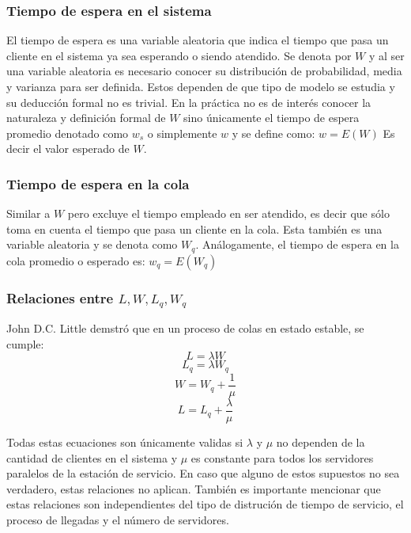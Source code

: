 \documentclass{article}
\begin{document}
\subsubsection{Tiempo de espera en el sistema}
El tiempo de espera es una variable aleatoria que indica el tiempo que pasa
un cliente en el sistema ya sea esperando o siendo atendido. 
Se denota por $W$ y al ser una variable aleatoria
es necesario conocer su distribución de probabilidad, media y varianza para ser
definida. Estos dependen de que tipo de modelo se estudia y su deducción formal
no es trivial. En la práctica no es de interés conocer la naturaleza y definición
formal de $W$ sino únicamente el tiempo de espera promedio 
denotado como $w_{s}$ o simplemente $w$ y se define como: $w = E\left(W\right) $
Es decir el valor esperado de $W$.
\subsubsection{Tiempo de espera en la cola}
Similar a $W$ pero excluye el tiempo empleado en ser atendido, es decir
que sólo toma en cuenta el tiempo que pasa un cliente en la cola. Esta 
también es una variable aleatoria y se denota como $W_{q}$. Análogamente,
el tiempo de espera en la cola promedio o esperado es: $w_{q} = E\left(W_{q}\right)$

\subsubsection{Relaciones entre $L, W, L_{q}, W_{q}$ }
John D.C. Little demstró que en un proceso de colas en estado estable, se cumple:
\begin{equation}
	\label{eq3:lw}
	L = \lambda W
\end{equation}
\begin{equation}
	\label{eq4:lwq}
	L_{q} = \lambda W_{q}
\end{equation}
\begin{equation}
	\label{eq5:wwq}
	W =  W_{q} + \frac{1}{\mu}
\end{equation}
\begin{equation}
	\label{eq6:llq}
	L =  L_{q} + \frac{\lambda}{\mu}
\end{equation}

Todas estas ecuaciones son únicamente validas si $\lambda$ y $\mu$ no dependen
de la cantidad de clientes en el sistema y $\mu$ es constante para todos los servidores 
paralelos de la estación de servicio. En caso que alguno de estos supuestos no 
sea verdadero, estas relaciones no aplican. También es importante mencionar que estas
relaciones son independientes del tipo de distrución de tiempo de servicio, el proceso
de llegadas y el número de servidores.
\end{document}

